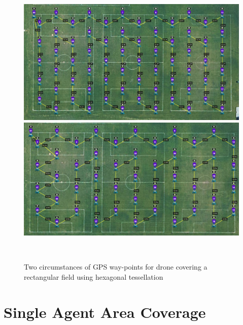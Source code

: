 \documentclass{article}
\begin{document}
\begin{figure}[H]
   \begin{minipage}{0.48\textwidth}
     \centering
     \includegraphics[width=.99\linewidth]{1.png}
   \end{minipage}\hfill
   \begin{minipage}{0.48\textwidth}
     \centering
     \includegraphics[width=.99\linewidth]{2.png}
   \end{minipage}
\\\caption{Two circumstances of GPS way-points for drone covering a rectangular field using hexagonal tessellation}
\end{figure}


\section{Single Agent Area Coverage}
\end{document}
